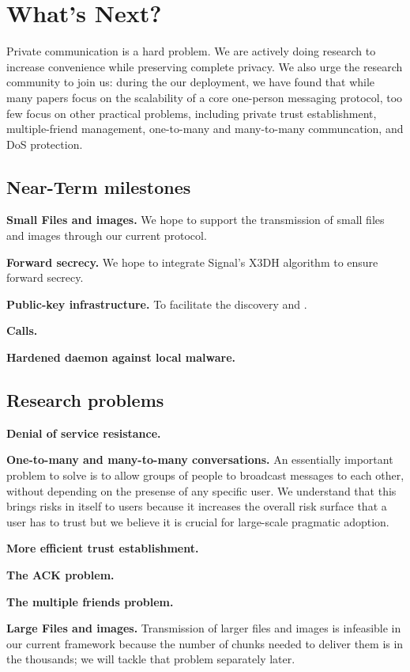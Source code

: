 \section{What's Next?}
\label{sec:future}

Private communication is a hard problem. We are actively doing research to increase convenience while preserving complete privacy. We also urge the research community to join us: during the our deployment, we have found that while many papers focus on the scalability of a core one-person messaging protocol, too few focus on other practical problems, including private trust establishment, multiple-friend management, one-to-many and many-to-many communcation, and DoS protection.


\subsection{Near-Term milestones}

\textbf{Small Files and images.} We hope to support the transmission of small files and images through our current protocol.

\textbf{Forward secrecy.} We hope to integrate Signal's X3DH algorithm to ensure forward secrecy.

\textbf{Public-key infrastructure.} To facilitate the discovery and .

\textbf{Calls.}

\textbf{Hardened daemon against local malware.}

\subsection{Research problems}

\textbf{Denial of service resistance.}

\textbf{One-to-many and many-to-many conversations.} An essentially important problem to solve is to allow groups of people to broadcast messages to each other, without depending on the presense of any specific user. We understand that this brings risks in itself to users because it increases the overall risk surface that a user has to trust but we believe it is crucial for large-scale pragmatic adoption.

\textbf{More efficient trust establishment.}

\textbf{The ACK problem.}

\textbf{The multiple friends problem.}

\textbf{Large Files and images.} Transmission of larger files and images is infeasible in our current framework because the number of chunks needed to deliver them is in the thousands; we will tackle that problem separately later.
